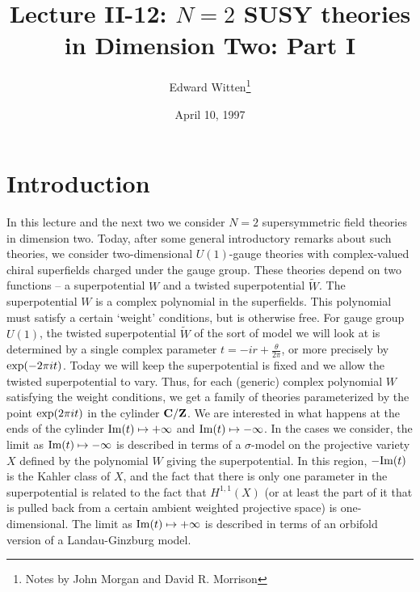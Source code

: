 \newcommand{\operatorname}[1]{\mathop{\rm #1}\nolimits}
\newcommand{\Tr}{\operatorname{Tr}}


\title{Lecture II-12: $N=2$ SUSY theories in Dimension Two: Part I}
\author{Edward Witten\thanks{Notes by John Morgan and David R. Morrison}}
\date{April 10, 1997}



\maketitle

\section{Introduction}

In this lecture and the next two we consider $N=2$ supersymmetric field
theories in  dimension two. Today, after some general introductory
remarks about such theories, we consider two-dimensional
$U(1)$-gauge theories with complex-valued chiral superfields charged
under the gauge group. These theories depend on two functions --
a superpotential
$W$ and a twisted superpotential $\widetilde{W}$.
The superpotential $W$ is a complex polynomial in the superfields.
This polynomial must satisfy a certain `weight' conditions, but is otherwise
free.
For gauge group $U(1)$,
the twisted superpotential
$\widetilde{W}$ of the sort of model we will look at
is determined by a single
complex parameter $t=-ir+\frac{\theta}{2\pi}$, or more precisely by ${\rm
exp}(-2\pi it)$.
Today we will keep the superpotential is fixed and we
allow the twisted superpotential to vary.  Thus, for each (generic)
complex polynomial $W$ satisfying the weight conditions, we get a
family of theories parameterized by the point ${\rm exp}(2\pi it)$ in
the cylinder ${\bf C}/{\bf Z}$.
We are interested in what happens at the ends of the cylinder ${\rm
Im}(t)\mapsto +\infty$ and ${\rm Im}(t)\mapsto-\infty$.
In the cases we consider, the limit as  ${\rm Im}(t)\mapsto -\infty$ is
described in terms of a
$\sigma$-model on the projective variety $X$
defined by the polynomial
$W$ giving the superpotential.  In this region, $-{\rm Im}(t)$ is the Kahler
class of $X$, and the fact that there is only one parameter in the
superpotential is related to the fact that $H^{1,1}(X)$ (or at least
the part of it that is pulled back from a certain ambient weighted
projective space) is one-dimensional.
The limit as ${\rm
Im}(t)\mapsto +\infty$ is described in terms of an orbifold
version of a Landau-Ginzburg model.

